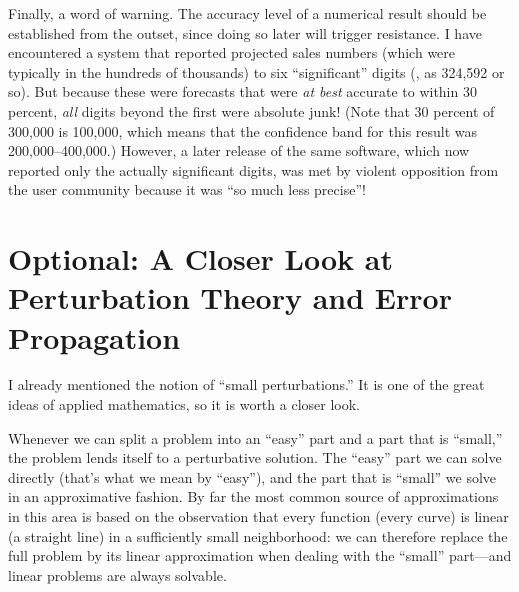 Finally, a word of warning. The accuracy level of a numerical result
should be established from the outset, since doing so later will
trigger resistance. I have encountered a system that reported
projected sales numbers (which were typically in the hundreds of
thousands) to six ``significant'' digits (\eg, as 324,592 or so).  But
because these were forecasts that were \emph{at best} accurate to
within 30 percent,  \emph{all} digits beyond the first were absolute
junk! (Note that 30 percent\vadjust{\pagebreak} of 300,000 is 100,000, which means that
the confidence band for this result was 200,000--400,000.)  However, a
later release of the same software, which now reported only the
actually significant digits, was met by violent opposition from the
user community because it was ``so much less precise''!


\section{Optional: A Closer Look at Perturbation Theory and Error Propagation}


I already mentioned the notion of ``small perturbations.'' It is one
of the great ideas of applied mathematics, so it is worth a closer
look.

Whenever we can split a problem into an ``easy'' part and a part that
is ``small,'' the problem lends itself to a perturbative solution. The
``easy'' part we can solve directly (that's what we mean by ``easy''),
and the part  that is ``small'' we solve in an approximative fashion.
By far the most common source of approximations in this area is based
on the observation that every function (every curve) is linear (a
straight line) in a sufficiently small neighborhood: we can therefore
replace the full problem by its linear approximation when dealing with
the ``small'' part---and linear problems are always solvable.


